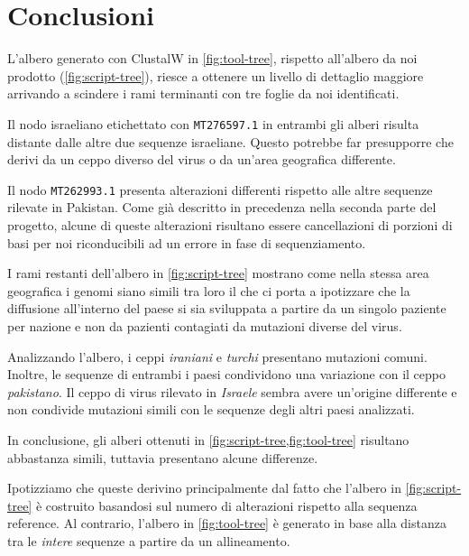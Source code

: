 \documentclass[11pt,italian]{article}
\begin{document}
\newpage
\section{Conclusioni}
L'albero generato con ClustalW in \cref{fig:tool-tree}, rispetto all'albero da noi prodotto (\cref{fig:script-tree}), riesce a ottenere un livello di dettaglio maggiore arrivando a scindere i rami terminanti con tre foglie da noi identificati.

Il nodo israeliano etichettato con \lstinline{MT276597.1} in entrambi gli alberi risulta distante dalle altre due sequenze israeliane. Questo potrebbe far presupporre che derivi da un ceppo diverso del virus o da un'area geografica differente.

Il nodo \lstinline{MT262993.1} presenta alterazioni differenti rispetto alle altre sequenze rilevate in Pakistan. Come già descritto in precedenza nella seconda parte del progetto, alcune di queste alterazioni risultano essere cancellazioni di porzioni di basi per noi riconducibili ad un errore in fase di sequenziamento.

I rami restanti dell'albero in \cref{fig:script-tree} mostrano come nella stessa area geografica i genomi siano simili tra loro il che ci porta a ipotizzare che la diffusione all'interno del paese si sia sviluppata a partire da un singolo paziente per nazione e non da pazienti contagiati da mutazioni diverse del virus.

Analizzando l'albero, i ceppi \textit{iraniani} e \textit{turchi} presentano mutazioni comuni. Inoltre, le sequenze di entrambi i paesi condividono una variazione con il ceppo \textit{pakistano}.
Il ceppo di virus rilevato in \textit{Israele} sembra avere un'origine differente e non condivide mutazioni simili con le sequenze degli altri paesi analizzati.

\vspace{2mm}
\noindent
In conclusione, gli alberi ottenuti in \cref{fig:script-tree,fig:tool-tree} risultano abbastanza simili, tuttavia presentano alcune differenze.

Ipotizziamo che queste derivino principalmente dal fatto che l'albero in \cref{fig:script-tree} è costruito basandosi sul numero di alterazioni rispetto alla sequenza reference.
Al contrario, l'albero in \cref{fig:tool-tree} è generato in base alla distanza tra le \textit{intere} sequenze a partire da un allineamento.
\end{document}
